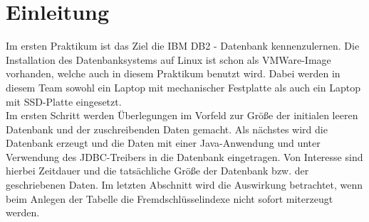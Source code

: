 \chapter{Einleitung}
Im ersten Praktikum ist das Ziel die IBM DB2 - Datenbank kennenzulernen. Die Installation des Datenbanksystems auf Linux ist schon als VMWare-Image vorhanden, welche auch in diesem Praktikum benutzt wird. Dabei werden in diesem Team sowohl ein Laptop mit mechanischer Festplatte als auch ein Laptop mit SSD-Platte eingesetzt.\\

Im ersten Schritt werden Überlegungen im Vorfeld zur Größe der initialen leeren Datenbank und der zuschreibenden Daten gemacht. Als nächstes wird die Datenbank erzeugt und die Daten mit einer Java-Anwendung und unter Verwendung des JDBC-Treibers in die Datenbank eingetragen. Von Interesse sind hierbei Zeitdauer und die tatsächliche Größe der Datenbank bzw. der geschriebenen Daten. Im letzten Abschnitt wird die Auswirkung betrachtet, wenn beim Anlegen der Tabelle die Fremdschlüsselindexe nicht sofort miterzeugt werden.